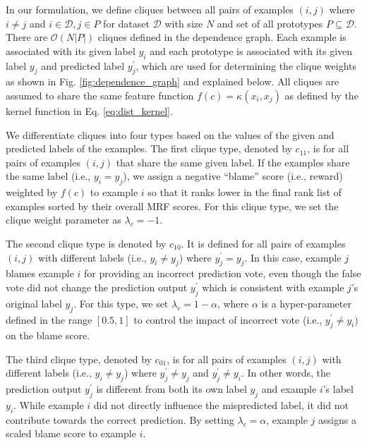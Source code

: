 In our formulation, we define cliques between all pairs of examples $(i,j)$ where $i \neq j$ and $i \in \mathcal{D}, j \in P$ for dataset $\mathcal{D}$ with size $N$ and set of all prototypes $P \subseteq \mathcal{D}$. There are $\mathcal{O}(N|P|)$ cliques defined in the dependence graph. 
Each example is associated with its given label $y_i$ and each prototype is associated with its given label $y_j$ and predicted label $y_j^\prime$, which are used for determining the clique weights as shown in Fig. \ref{fig:dependence_graph} and explained below.
All cliques are assumed to share the same feature function $f(c) = \kappa(x_i, x_j)$ as defined by the kernel function in Eq. \ref{eq:dist_kernel}. 











We differentiate cliques into four types based on the values of the given and predicted labels of the examples. 
The first clique type, denoted by $c_{11}$, is for all pairs of examples $(i, j)$ that share the same given label. If the examples share the same label (i.e., $y_i = y_j$), we assign a negative ``blame'' score (i.e., reward) weighted by $f(c)$ to example $i$ so that it ranks lower in the final rank list of examples sorted by their overall MRF scores. For this clique type, we set the clique weight parameter as $\lambda_c = -1$. 

The second clique type is denoted by $c_{10}$. It is defined for all pairs of examples $(i, j)$ with different labels (i.e., $y_i \neq y_j$) where $y_{j}^\prime = y_{j}$. In this case, example $j$ blames example $i$ for providing an incorrect prediction vote, even though the false vote did not change the prediction output $y_{j}^\prime$ which is consistent with example $j$'s original label $y_j$. For this type, we set $\lambda_c = 1 - \alpha$, where $\alpha$ is a hyper-parameter defined in the range $[0.5,1]$ to control the impact of incorrect vote (i.e., $y_j^\prime \neq y_i)$ on the blame score. 







The third clique type, denoted by $c_{01}$, is for all pairs of examples $(i, j)$ with different labels (i.e., $y_i \neq y_j$) where $y_{j}^\prime \neq y_{j}$ and $y_{j}^\prime \neq y_{i}$. In other words, the prediction output $y_{j}^\prime$ is different from both its own label $y_{j}$ and example $i$'s label $y_i$. While example $i$ did not directly influence the mispredicted label, it did not contribute towards the correct prediction. By setting $\lambda_c = \alpha$, example $j$ assigns a scaled blame score to example $i$.



